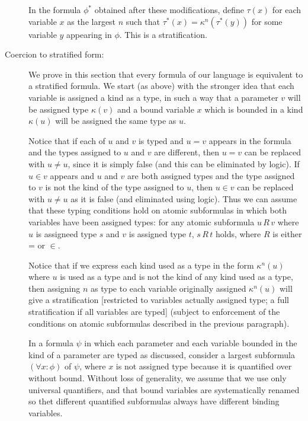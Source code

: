 \documentclass[12pt]{article}
\begin{document}
\begin{description}
 In the formula
$\phi^*$ obtained after these modifications, define $\tau(x)$ for each variable $x$ as the largest $n$ such that $\tau^*(x) = \kappa^n(\tau^*(y))$ for some variable $y$ appearing in $\phi$.  This is a stratification.



\item[Coercion to stratified form:]

We prove in this section that every formula of our language is equivalent to a stratified formula.  We start (as above) with the stronger idea that each variable is assigned a kind as a type, in such a way that a parameter $v$ will be assigned type $\kappa(v)$ and a bound variable $x$ which is bounded in a kind $\kappa(u)$ will be assigned the same type as $u$.  

Notice that if each of $u$ and $v$ is typed and $u=v$ appears in the formula and the types assigned to $u$ and $v$ are different, then $u=v$ can be replaced with $u \neq u$, since it is simply false (and this can be eliminated by logic).  If $u \in v$ appears and $u$ and $v$ are both assigned types and the type assigned to $v$ is not the kind of the type assigned to $u$, then $u \in v$ can be replaced
with $u \neq u$ as it is false (and eliminated using logic).  Thus we can assume that these typing conditions hold on atomic subformulas in which both variables have been assigned types:  for any atomic subformula $u \, R\, v$ where $u$  is assigneed type $s$ and $v$ is assigned
type $t$, $s \, R \, t$ holds, where $R$ is either = or $\in$.

Notice that if we express each kind used as a type in the form $\kappa^n(u)$ where $u$ is used as a type and is not the kind of any kind used as a type, then assigning $n$ as type to each variable originally assigned $\kappa^n(u)$ will give a stratification [restricted to variables actually assigned type;  a full stratification if all variables are typed] (subject to enforcement of the conditions on atomic subformulas described in the previous paragraph).

In a formula $\psi$ in which each parameter and each variable bounded in the kind of a parameter are typed as discussed, consider
a largest subformula $(\forall x:\phi)$ of $\psi$, where $x$ is not assigned type because it is quantified over without bound.  Without loss of generality, we assume that we use only universal quantifiers, and that
bound variables are systematically renamed so thet different quantified subformulas always have different binding variables.


\end{description}
\end{document}
